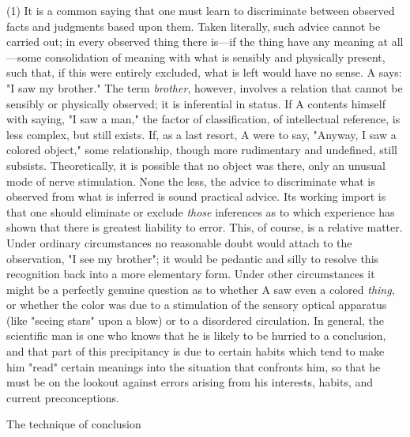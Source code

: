 \documentclass[letterpaper]{book}
\begin{document}
(1) It is a common saying that one must learn to discriminate between
observed facts and judgments based upon them. Taken literally, such
advice cannot be carried out; in every observed thing there is---if the
thing have any meaning at all---some consolidation of meaning with what
is sensibly and physically present, such that, if this were entirely
excluded, what is left would have no sense. A says: "I saw my brother."
The term \emph{brother}, however, involves a relation that cannot be
sensibly or physically observed; it is inferential in status. If A
contents himself with saying, "I saw a man," the factor of
classification, of intellectual reference, is less complex, but still
exists. If, as a last resort, A were to say, "Anyway, I saw a colored
object," some relationship, though more rudimentary and undefined, still
subsists. Theoretically, it is possible that
no
object was there, only an unusual mode of nerve stimulation. None the
less, the advice to discriminate what is observed from what is inferred
is sound practical advice. Its working import is that one should
eliminate or exclude \emph{those} inferences as to which experience has
shown that there is greatest liability to error. This, of course, is a
relative matter. Under ordinary circumstances no reasonable doubt would
attach to the observation, "I see my brother"; it would be pedantic and
silly to resolve this recognition back into a more elementary form.
Under other circumstances it might be a perfectly genuine question as to
whether A saw even a colored \emph{thing}, or whether the color was due
to a stimulation of the sensory optical apparatus (like "seeing stars"
upon a blow) or to a disordered circulation. In general, the scientific
man is one who knows that he is likely to be hurried to a conclusion,
and that part of this precipitancy is due to certain habits which tend
to make him "read" certain meanings into the situation that confronts
him, so that he must be on the lookout against errors arising from his
interests, habits, and current preconceptions.

The technique of conclusion
\end{document}
